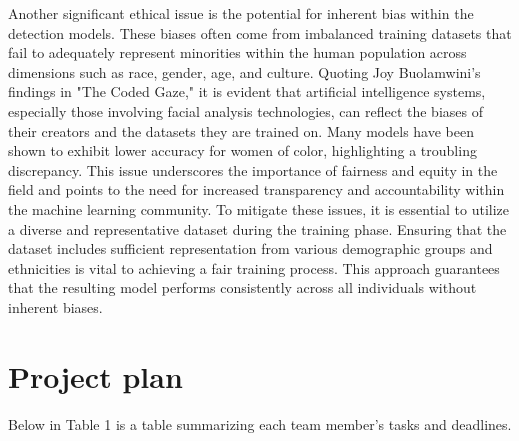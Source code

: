 \documentclass{article} %
\begin{document}
Another significant ethical issue is the potential for inherent bias within the detection models. These biases often come from imbalanced training datasets that fail to adequately represent minorities within the human population across dimensions such as race, gender, age, and culture. Quoting Joy Buolamwini’s findings in "The Coded Gaze," it is evident that artificial intelligence systems, especially those involving facial analysis technologies, can reflect the biases of their creators and the datasets they are trained on. Many models have been shown to exhibit lower accuracy for women of color, highlighting a troubling discrepancy. This issue underscores the importance of fairness and equity in the field and points to the need for increased transparency and accountability within the machine learning community. To mitigate these issues, it is essential to utilize a diverse and representative dataset during the training phase. Ensuring that the dataset includes sufficient representation from various demographic groups and ethnicities is vital to achieving a fair training process. This approach guarantees that the resulting model performs consistently across all individuals without inherent biases.


\section{Project plan }
Below in Table 1 is a table summarizing each team member’s tasks and deadlines.
\end{document}
